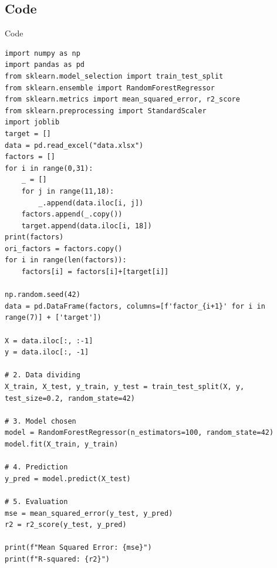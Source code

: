 \documentclass[a4paper]{article}
\begin{document}
    \subsection{Code}
\begin{listing}[h]\caption{Code}
    \begin{verbatim}
import numpy as np
import pandas as pd
from sklearn.model_selection import train_test_split
from sklearn.ensemble import RandomForestRegressor
from sklearn.metrics import mean_squared_error, r2_score
from sklearn.preprocessing import StandardScaler
import joblib
target = []
data = pd.read_excel("data.xlsx")
factors = []
for i in range(0,31):
    _ = []
    for j in range(11,18):
        _.append(data.iloc[i, j])
    factors.append(_.copy())
    target.append(data.iloc[i, 18])
print(factors)
ori_factors = factors.copy()
for i in range(len(factors)):
    factors[i] = factors[i]+[target[i]]

np.random.seed(42)
data = pd.DataFrame(factors, columns=[f'factor_{i+1}' for i in range(7)] + ['target'])

X = data.iloc[:, :-1]  
y = data.iloc[:, -1]   

# 2. Data dividing
X_train, X_test, y_train, y_test = train_test_split(X, y, test_size=0.2, random_state=42)

# 3. Model chosen
model = RandomForestRegressor(n_estimators=100, random_state=42)
model.fit(X_train, y_train)

# 4. Prediction
y_pred = model.predict(X_test)

# 5. Evaluation
mse = mean_squared_error(y_test, y_pred)
r2 = r2_score(y_test, y_pred)

print(f"Mean Squared Error: {mse}")
print(f"R-squared: {r2}")

    \end{verbatim}
\end{listing}
\end{document}
